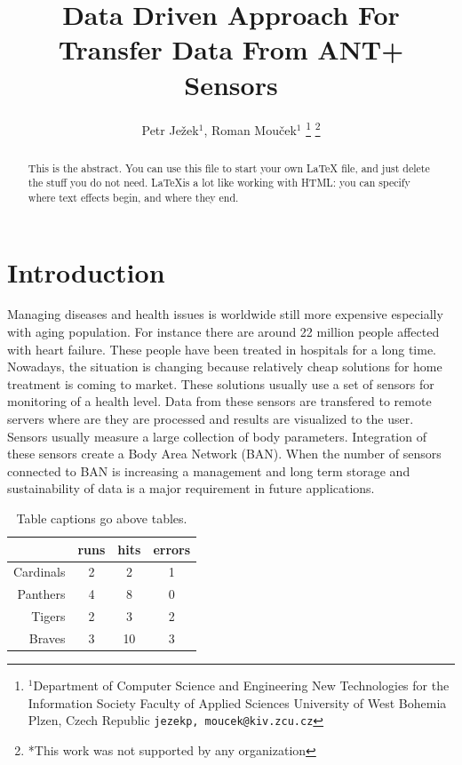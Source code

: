\documentclass[conference]{IEEEconf}
\begin{document}
  \title{Data Driven Approach For Transfer Data  From ANT+ Sensors}

  \author{{Petr Je\v{z}ek$^{1}$, Roman Mou\v{c}ek$^{1}$}
\thanks{$^{1}$Department of Computer Science and Engineering
New Technologies for the Information Society
Faculty of Applied Sciences
University of West Bohemia
Plzen, Czech Republic
        {\tt\small {jezekp, moucek}@kiv.zcu.cz}}%
\thanks{*This work was not supported by any organization}%
}
\maketitle


\begin{abstract}
This is the abstract. You can use this file to start your own LaTeX file,
and just delete the stuff you do not need. \LaTeX  is a lot like working
with HTML: you can specify where text effects begin, and where they end.
\end{abstract}

\section{Introduction}\label{sec:intro}
Managing diseases and health issues is worldwide still more expensive especially with aging population. For instance there are around 22 million people affected with heart failure.  These people have been treated in hospitals for a long time. Nowadays, the situation is changing because relatively cheap solutions for home treatment is coming to market. These solutions usually use a set of sensors for monitoring of a health level. Data from these sensors are transfered to remote servers where are they are processed and results are visualized to the user. Sensors usually measure a large collection of body parameters. Integration of these sensors create a Body Area Network (BAN). When the number of sensors connected to BAN is increasing a management and long term storage and sustainability of data is a major requirement in future applications.



\begin{table}[!hbt]
\begin{center}
  \caption{Table captions go above tables.}
  \vspace{0.2in}
  \begin{tabular}{|r|c|c|c|}
     \hline
 & runs & hits & errors  \\
     \hline
Cardinals  & 2 & 2 & 1  \\
Panthers & 4 & 8 & 0  \\
Tigers  & 2 & 3 & 2  \\
Braves  & 3 & 10 & 3  \\
     \hline
  \end{tabular}
  \label{tab:example_tab}
\end{center}
\end{table}
\end{document}
